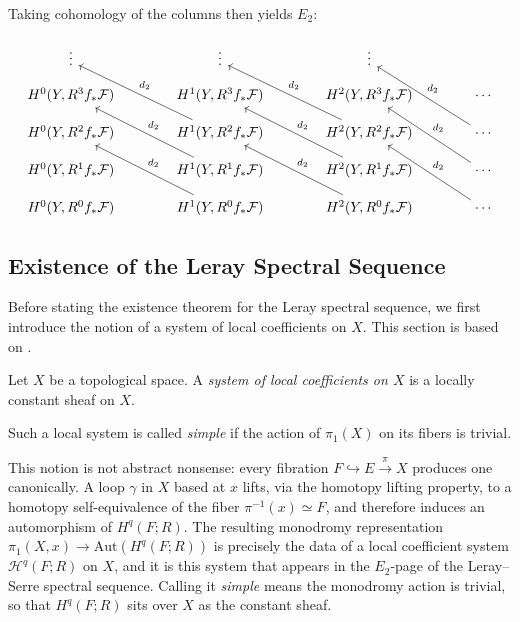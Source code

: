 \begin{example}
Taking cohomology of the columns then yields $E_2$:


\[
\begin{tikzcd}[column sep=large, row sep=small, ampersand replacement=\&]
|[alias=v0]| \vdots \& |[alias=v1]| \vdots \& |[alias=v2]| \vdots \& \\
|[alias=a03]| H^0(Y, R^3 f_*\mathcal{F}) \& |[alias=a13]| H^1(Y, R^3 f_*\mathcal{F}) \& |[alias=a23]| H^2(Y, R^3 f_*\mathcal{F}) \& \cdots \\
|[alias=a02]| H^0(Y, R^2 f_*\mathcal{F}) \& |[alias=a12]| H^1(Y, R^2 f_*\mathcal{F}) \ar[to=v0, "d_2"'] \& |[alias=a22]| H^2(Y, R^2 f_*\mathcal{F}) \ar[to=v1, "d_2"'] \& \cdots \ar[to=v2, "d_2"'] \\
H^0(Y, R^1 f_*\mathcal{F}) \& H^1(Y, R^1 f_*\mathcal{F}) \ar[to=a03, "d_2"'] \& H^2(Y, R^1 f_*\mathcal{F}) \ar[to=a13, "d_2"'] \& \cdots \ar[to=a23, "d_2"'] \\
H^0(Y, R^0 f_*\mathcal{F}) \& H^1(Y, R^0 f_*\mathcal{F}) \ar[to=a02, "d_2"'] \& H^2(Y, R^0 f_*\mathcal{F}) \ar[to=a12, "d_2"'] \& \cdots \ar[to=a22, "d_2"']
\end{tikzcd}
\]
\end{example}



\subsection{Existence of the Leray Spectral Sequence}

Before stating the existence theorem for the Leray spectral sequence, we first introduce the notion of a system of local coefficients on $X$. This section is based on \cite{mccleary}.

\begin{definition}
Let $X$ be a topological space. A \textit{system of local coefficients on $X$} is a locally constant sheaf on $X$.

Such a local system is called \textit{simple} if the action of $\pi_1(X)$ on its fibers is trivial.
\end{definition}


This notion is not abstract nonsense: every fibration 
$F \hookrightarrow E \xrightarrow{\pi} X$ produces one 
canonically. A loop $\gamma$ in $X$ based at $x$ lifts, via 
the homotopy lifting property, to a homotopy self-equivalence 
of the fiber $\pi^{-1}(x) \simeq F$, and therefore induces an 
automorphism of $H^q(F; R)$. The resulting monodromy 
representation $\pi_1(X, x) \to \mathrm{Aut}(H^q(F; R))$ 
is precisely the data of a local coefficient system 
$\mathcal{H}^q(F; R)$ on $X$, and it is this system that 
appears in the $E_2$-page of the Leray--Serre spectral 
sequence. Calling it \emph{simple} means the monodromy 
action is trivial, so that $H^q(F; R)$ sits over $X$ as the 
constant sheaf.




